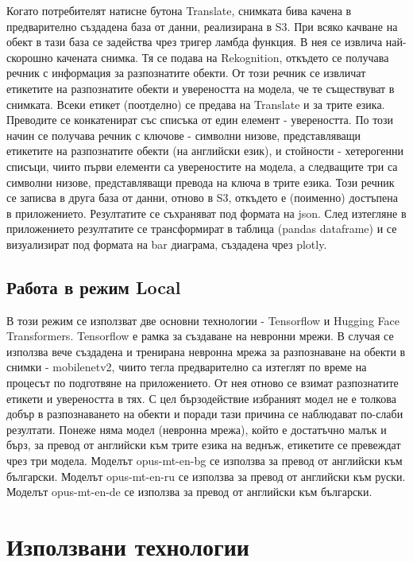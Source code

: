 \documentclass[12pt]{article}
\begin{document}
\noindent Когато потребителят натисне бутона Translate, снимката бива качена в предварително създадена база от данни, реализирана в S3. При всяко качване на обект в тази база се задейства чрез тригер ламбда функция. В нея се извлича най-скорошно качената снимка. Тя се подава на Rekognition, откъдето се получава речник с информация за разпознатите обекти. От този речник се извличат етикетите на разпознатите обекти и увереността на модела, че те съществуват в снимката. Всеки етикет (поотделно) се предава на Translate и за трите езика. Преводите се конкатенират със списъка от един елемент - увереността. По този начин се получава речник с ключове - символни низове, представляващи етикетите на разпознатите обекти (на английски език), и стойности - хетерогенни списъци, чиито първи елементи са увереностите на модела, а следващите три са символни низове, представляващи превода на ключа в трите езика. Този речник се записва в друга база от данни, отново в S3, откъдето е (поименно) достъпена в приложението. Резултатите се съхраняват под формата на json. След изтегляне в приложението резултатите се трансформират в таблица (pandas dataframe) и се визуализират под формата на bar диаграма, създадена чрез plotly.

\subsection{Работа в режим Local}

\noindent В този режим се използват две основни технологии - Tensorflow и Hugging Face Transformers. Tensorflow е рамка за създаване на невронни мрежи. В случая се използва вече създадена и тренирана невронна мрежа за разпознаване на обекти в снимки - mobilenetv2, чиито тегла предварително са изтеглят по време на процесът по подготвяне на приложението. От нея отново се взимат разпознатите етикети и увереността в тях. С цел бързодействие избраният модел не е толкова добър в разпознаването на обекти и поради тази причина се наблюдават по-слаби резултати. Понеже няма модел (невронна мрежа), който е достатъчно малък и бърз, за превод от английски към трите езика на веднъж, етикетите се превеждат чрез три модела. Моделът opus-mt-en-bg се използва за превод от английски към български. Моделът opus-mt-en-ru се използва за превод от английски към руски. Моделът opus-mt-en-de се използва за превод от английски към български.

\section{Използвани технологии}
\end{document}
